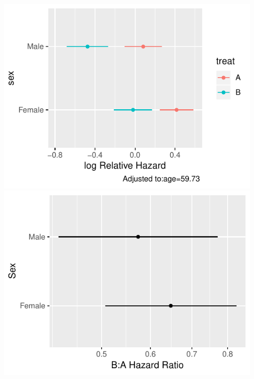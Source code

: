 \centerline{\includegraphics[width=\maxwidth]{ancova-hteplot2-1} \includegraphics[width=\maxwidth]{ancova-hteplot2-2} }


